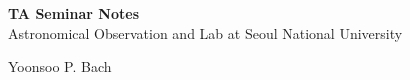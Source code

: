 \documentclass[11pt,a4paper]{book}
\begin{document}
\begingroup
\thispagestyle{empty}
\centering
\vspace*{5cm}
\par\normalfont\fontsize{35}{35}\sffamily\selectfont
\textbf{TA Seminar Notes}\\
{\LARGE Astronomical Observation and Lab at Seoul National University}\par %
\vspace*{1cm}
{\Huge Yoonsoo P. Bach}\par %
\endgroup

\tableofcontents




\end{document}
